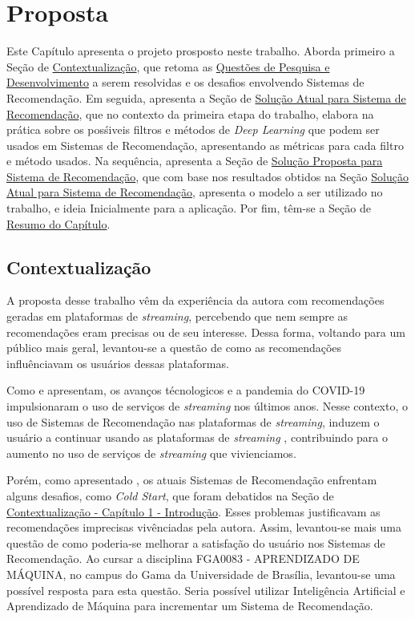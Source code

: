 \chapter[Proposta]{Proposta}\label{chap:proposta}

Este Capítulo apresenta o projeto prosposto neste trabalho. Aborda primeiro a Seção de \hyperref[sec:contextualizacaop]{Contextualização},
que retoma as \hyperref[sec:questaopesquisa]{Questões de Pesquisa e Desenvolvimento} a serem resolvidas e os desafios envolvendo
Sistemas de Recomendação. Em seguida, apresenta a Seção de \hyperref[sec:poc]{Solução Atual para Sistema de}  
\hyperref[sec:poc]{Recomendação}, que no contexto
da primeira etapa do trabalho, elabora na prática sobre os posśiveis filtros e métodos de \textit{Deep Learning} que podem ser usados
em Sistemas de Recomendação, apresentando as métricas para cada filtro e método usados. Na sequência, apresenta a Seção de
\hyperref[sec:solucao]{Solução Proposta para Sistema de Recomendação}, que com base nos resultados obtidos na Seção 
\hyperref[sec:poc]{Solução Atual para Sistema de Recomendação}, apresenta o modelo a ser utilizado no trabalho, e ideia Inicialmente
para a aplicação. Por fim, têm-se a Seção de \hyperref[sec:resprop]{Resumo do Capítulo}.

\section{Contextualização}\label{sec:contextualizacaop}

A proposta desse trabalho vêm da experiência da autora com recomendações geradas em plataformas de \textit{streaming}, 
percebendo que nem sempre as recomendações eram precisas ou de seu interesse. Dessa forma, voltando para um público mais
geral, levantou-se a questão de como as recomendações influênciavam os usuários dessas plataformas.

Como  e  apresentam, os avanços técnologicos e a pandemia do
COVID-19 impulsionaram o uso de serviços de \textit{streaming} nos últimos anos. Nesse contexto, o uso de Sistemas de Recomendação
nas plataformas de \textit{streaming}, induzem o usuário a continuar usando as plataformas de \textit{streaming} 
\cite{HASAN2018220}, contribuindo para o aumento no uso de serviços de \textit{streaming} que vivienciamos.

Porém, como apresentado , os atuais Sistemas de Recomendação enfrentam alguns desafios, como 
\textit{Cold Start}, que foram debatidos na Seção de 
\hyperref[sec:contextualizacao]{Contextualização - Capítulo 1 - Introdução}. Esses problemas justificavam as recomendações
imprecisas vivênciadas pela autora. Assim, levantou-se mais uma questão de como poderia-se melhorar a satisfação do usuário
nos Sistemas de Recomendação. Ao cursar a disciplina FGA0083 - APRENDIZADO DE MÁQUINA, no campus do Gama da Universidade de
Brasília, levantou-se uma possível resposta para esta questão. Seria possível utilizar Inteligência Artificial e Aprendizado
de Máquina para incrementar um Sistema de Recomendação.

